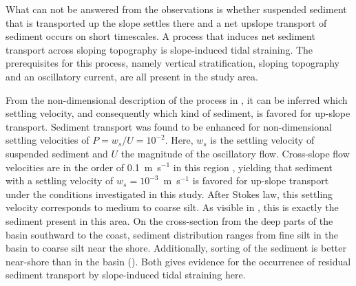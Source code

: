 What can not be answered from the observations is whether suspended sediment 
that is transported up the slope settles there and a net upslope transport of 
sediment occurs on short timescales. A process that induces net sediment 
transport across sloping 
topography is slope-induced tidal straining. The prerequisites for this 
process, namely vertical stratification, sloping topography and an oscillatory 
current, are all present in the study area. 

From the non-dimensional description of the process in \cite{schulzumlauf2016}, 
it can be inferred which settling velocity, and consequently which kind of 
sediment, 
is favored for up-slope transport. Sediment transport was found 
to be enhanced for non-dimensional settling velocities of $P= w_s \slash U = 
10^{-2}$. Here, $w_s$ is the settling velocity of suspended sediment and $U$ 
the magnitude of the oscillatory flow. Cross-slope flow velocities are in the 
order of 0.1~m~s$^{-1}$ in this region \citep[][data from this 
study]{lass1993}, yielding that 
sediment with a settling velocity of $w_s=10^{-3}$~m~s$^{-1}$ is favored for 
up-slope transport under the conditions investigated in this study. After 
Stokes law, this settling velocity corresponds to medium to coarse silt. As 
visible in , this is exactly the sediment present in this 
area. On the cross-section from the deep parts of the basin southward to the 
coast, sediment 
distribution ranges from fine silt in the basin to coarse silt near the shore. 
Additionally, sorting of the sediment is better near-shore than in the basin 
(). 
Both gives evidence for the occurrence of residual sediment transport by 
slope-induced 
tidal straining here.

